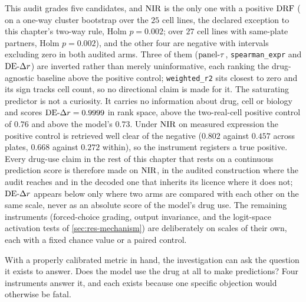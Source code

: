 \begin{claim}
This audit grades five candidates, and $\textrm{NIR}$ is the only
one with a positive $\textrm{DRF}$ ( on a one-way cluster
bootstrap over the $25$ cell lines, the declared exception to this chapter's
two-way rule, Holm $p = 0.002$;  over $27$ cell lines
with same-plate partners, Holm $p = 0.002$), and the other four are negative with
intervals excluding zero in both audited arms. Three of them ($\textrm{panel-}\tau$,
\texttt{spearman\_expr} and $\textrm{DE-}\Delta r$) are inverted rather than merely
uninformative, each ranking the drug-agnostic baseline above the positive
control; \texttt{weighted\_r2} sits closest to zero and its sign tracks cell
count, so no directional claim is made for it. The saturating predictor is not a
curiosity. It carries no information about drug, cell or biology and scores
$\textrm{DE-}\Delta r = 0.9999$ in rank space, above the two-real-cell positive control of
$0.76$ and above the model's $0.73$. Under $\textrm{NIR}$ on measured expression the positive control is retrieved well clear of
the negative ($0.802$ against $0.457$ across plates, $0.668$ against $0.272$
within), so the instrument registers a true positive. Every drug-use claim in
the rest of this chapter that rests on a continuous prediction score is
therefore made on $\textrm{NIR}$, in the audited construction where the audit reaches
and in the decoded one that inherits its licence where it does not; $\textrm{DE-}\Delta r$
appears below only where two arms are compared with each other on the same
scale, never as an absolute score of the model's drug use. The remaining instruments (forced-choice grading,
output invariance, and the logit-space activation tests of
\cref{sec:res-mechanism}) are deliberately on scales of their own, each with a
fixed chance value or a paired control.
\end{claim}


\clearpage
{}
\label{sec:methods-controls}   %


\begin{question}[2]
With a properly calibrated metric in hand, the investigation can ask the
question it exists to answer. Does the model use the drug at all to make predictions? Four
instruments answer it, and each exists because one specific objection would
otherwise be fatal.
\end{question}

